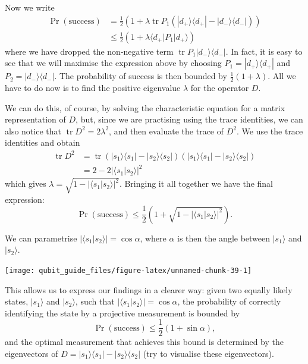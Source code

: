 \documentclass[fleqn,a4paper]{article}
\renewcommand{\footnote}[1]{\sidenotetext[{\color{white}0}\!\!]{\footnotesize #1}}
\theoremstyle{definition}
\theoremstyle{definition}
\theoremstyle{definition}
\theoremstyle{definition}
\theoremstyle{remark}
\begin{document}
Now we write
\[
\begin{aligned}
  \Pr (\text{success})
  &= \frac{1}{2}\left(
      1 + \lambda\operatorname{tr}P_1\left( |d_+\rangle\langle d_+|-|d_-\rangle\langle d_-| \right)
    \right)
\\&\leqslant\frac{1}{2}\left(
      1+\lambda \langle d_+|P_1|d_+\rangle
    \right)
\end{aligned}
\]
where we have dropped the non-negative term \(\operatorname{tr}P_1|d_-\rangle\langle d_-|\).
In fact, it is easy to see that we will maximise the expression above by choosing \(P_1 = |d_+\rangle\langle d_+|\) and \(P_2 = |d_-\rangle\langle d_-|\).
The probability of success is then bounded by \(\frac{1}{2}(1+\lambda)\).
All we have to do now is to find the positive eigenvalue \(\lambda\) for the operator \(D\).

We can do this, of course, by solving the characteristic equation for a matrix representation of \(D\), but, since we are practising using the trace identities, we can also notice that \(\operatorname{tr}D^2 = 2\lambda^2\), and then evaluate the trace of \(D^2\).
We use the trace identities and obtain
\[
  \begin{aligned}
    \operatorname{tr}D^2
    &= \operatorname{tr}\left( |s_1\rangle\langle s_1|-|s_2\rangle\langle s_2| \right) \left( |s_1\rangle\langle s_1|-|s_2\rangle\langle s_2| \right)
  \\&= 2-2|\langle s_1|s_2\rangle|^2
  \end{aligned}
\]
which gives \(\lambda = \sqrt{1-|\langle s_1|s_2\rangle|^2}\).
Bringing it all together we have the final expression:
\[
 \Pr (\text{success})
 \leqslant\frac{1}{2}\left( 1+ \sqrt{1-|\langle s_1|s_2\rangle|^2} \right).
\]

We can parametrise \(|\langle s_1|s_2\rangle| = \cos\alpha\), where \(\alpha\) is then the angle between \(|s_1\rangle\) and \(|s_2\rangle\).

\begin{center}\texttt{[image: qubit\_guide\_files/figure-latex/unnamed-chunk-39-1]} \end{center}

This allows us to express our findings in a clearer way: given two equally likely states, \(|s_1\rangle\) and \(|s_2\rangle\), such that \(|\langle s_1|s_2\rangle| = \cos\alpha\), the probability of correctly identifying the state by a projective measurement is bounded by\footnote{Here we use that \(\cos^2\alpha+\sin^2\alpha=1\) for any \(\alpha\).}
\[
 \Pr (\text{success})
 \leqslant\frac{1}{2}(1 + \sin\alpha),
\]
and the optimal measurement that achieves this bound is determined by the eigenvectors of \(D = |s_1\rangle\langle s_1|-|s_2\rangle\langle s_2|\) (try to visualise these eigenvectors).
\end{document}
